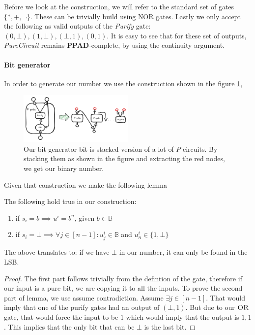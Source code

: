 Before we look at the construction, we will refer to the standard set of gates $\{*, + , \neg\}$. These can
be trivially build using $\text{NOR}$ gates. Lastly we only accept the following as valid outputs of
the \textit{Purify} gate: $(0, \bot), (1, \bot), (\bot,1), (0,1)$. It is easy to see that for these set
of outputs, \textit{PureCircuit} remains \textbf{PPAD}-complete, by using the continuity argument.



\paragraph{Bit generator}

In order to generate our number we use the construction shown in the figure \ref{fig:main-proof:purification},

\begin{figure}[h!]
    \centering
    \includegraphics[width=0.5\textwidth, clip]{assets/purification_generator.png}
    \caption{Our bit generator bit is stacked version of a lot of $P$ circuits. By stacking them as shown in the figure and extracting the red nodes,
    we get our binary number.}
    \label{fig:main-proof:purification}
\end{figure}
\FloatBarrier

Given that construction we make the following lemma

\begin{lemma}
    \label{lem:bit-gen}
    The following hold true in our construction:
    \begin{enumerate}
        \item if $s_i = b \implies u^i = b^n$, given $b \in \mathbb{B}$
        \item if $s_i = \bot \implies \forall j \in [n-1]: u^i_j \in \mathbb{B}$ and $u^i_{n} \in \{1, \bot\}$
    \end{enumerate}
    The above translates to: if we have $\bot$ in our number, it can only be found in the LSB.
\end{lemma}

\begin{proof}
    The first part follows trivially from the defintion of the  gate, therefore if our input is a pure bit,
    we are copying it to all the inputs. To prove the second part of lemma, we use assume contradiction.
    Assume $\exists j \in [n-1]$. That would imply that one of the purify gates had an output of $(\bot, 1)$.
    But due to our $\textsc{OR}$ gate, that would force the input to be $1$ which would imply that the output is $1,1$.
    This implies that the only bit that can be $\bot$ is the last bit.
\end{proof}




